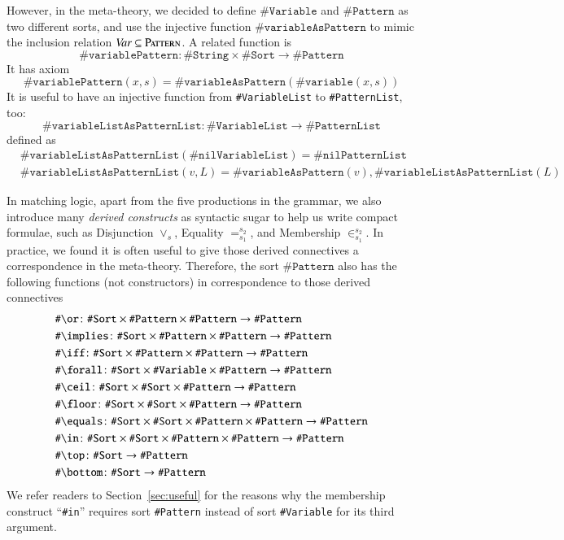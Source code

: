 \documentclass[UTF8,11pt]{article}
\theoremstyle{plain}
\theoremstyle{definition}
\theoremstyle{remark}
\newcommand{\sharpsymbol}{\#}
\newcommand{\KString}{\texttt{\sharpsymbol String}}
\newcommand{\KSort}{\texttt{\sharpsymbol Sort}}
\newcommand{\KPatternList}{\texttt{\sharpsymbol PatternList}}
\newcommand{\KnilKPatternList}{\texttt{\sharpsymbol nilPatternList}}
\newcommand{\KVariableList}{\texttt{\sharpsymbol VariableList}\xspace}
\newcommand{\KnilKVariableList}{\texttt{\sharpsymbol nilVariableList}}
\newcommand{\KVariable}{\texttt{\sharpsymbol Variable}}
\newcommand{\KVariableAsKPattern}{\texttt{\sharpsymbol variableAsPattern}}
\newcommand{\KvariablePattern}{\texttt{\sharpsymbol variablePattern}}
\newcommand{\KPattern}{\texttt{\sharpsymbol Pattern}}
\newcommand{\Kvariable}{\texttt{\sharpsymbol variable}}
\newcommand{\Kor}{\texttt{\sharpsymbol \slashsymbol  or}}
\newcommand{\Kimplies}{\texttt{\sharpsymbol  \slashsymbol implies}}
\newcommand{\Kiff}{\texttt{\sharpsymbol  \slashsymbol iff}}
\newcommand{\Kforall}{\texttt{\sharpsymbol \slashsymbol  forall}}
\newcommand{\Kequals}{\texttt{\sharpsymbol \slashsymbol  equals}}
\newcommand{\Kmembership}{\Kin}
\newcommand{\Kin}{\texttt{\sharpsymbol \slashsymbol  in}}
\newcommand{\Ktop}{\texttt{\sharpsymbol \slashsymbol  top}}
\newcommand{\Kbottom}{\texttt{\sharpsymbol \slashsymbol  bottom}}
\newcommand{\Kfloor}{\texttt{\sharpsymbol \slashsymbol  floor}}
\newcommand{\Kceil}{\texttt{\sharpsymbol \slashsymbol  ceil}}
\newcommand{\KVariableListAsKPatternList}
    {\texttt{\sharpsymbol variableListAsPatternList}\xspace}
\newcommand{\Pattern}{\textsc{Pattern}\xspace}
\newcommand{\slashsymbol}{\symbol{92}}
\begin{document}
However, in the meta-theory, we decided to define $\KVariable$ and $\KPattern$ as two different sorts, and use the injective function $\KVariableAsKPattern$ to mimic the inclusion relation $\Var \subseteq \Pattern$.
A related function is
$$
\KvariablePattern \colon \KString \times \KSort \to \KPattern
$$
It has axiom
$$
\KvariablePattern(x,s) = \KVariableAsKPattern(\Kvariable(x,s))
$$
It is useful to have an injective function from
\KVariableList to \KPatternList, too:
$$
\KVariableListAsKPatternList \colon \KVariableList \to \KPatternList
$$
defined as
\begin{align*}
&\KVariableListAsKPatternList(\KnilKVariableList) = \KnilKPatternList \\
&\KVariableListAsKPatternList(v, L) =
 \KVariableAsKPattern(v), \KVariableListAsKPatternList(L)
\end{align*}



In matching logic, apart from the five productions in the grammar, we also
introduce many \emph{derived constructs} as syntactic sugar to help
us write compact formulae, such as Disjunction $\vee_s$, Equality
$=_{s_1}^{s_2}$, and Membership $\in_{s_1}^{s_2}$.
In practice, we found it is often useful to give those derived connectives a
correspondence in the meta-theory. Therefore, the sort $\KPattern$ also has
the following functions (not constructors) in correspondence to those derived
connectives
\begin{align*}
  & \Kor \colon \KSort\times\KPattern \times \KPattern   \to \KPattern
  \\
  & \Kimplies \colon \KSort\times\KPattern \times \KPattern   \to \KPattern
  \\
  & \Kiff \colon \KSort\times\KPattern \times \KPattern   \to \KPattern
  \\
  & \Kforall \colon \KSort\times\KVariable \times \KPattern   \to \KPattern
  \\
  & \Kceil \colon \KSort\times\KSort\times\KPattern     \to \KPattern
  \\
  & \Kfloor \colon \KSort\times\KSort\times\KPattern     \to \KPattern
  \\
  & \Kequals \colon \KSort\times\KSort \times \KPattern \times \KPattern \to
  \KPattern
  \\
  & \Kmembership \colon \KSort \times \KSort \times \KPattern \times
  \KPattern  \to \KPattern
  \\
  & \Ktop \colon \KSort \to \KPattern
  \\
  & \Kbottom \colon \KSort \to \KPattern
\end{align*}
We refer readers to Section~\ref{sec:useful} for the reasons why the membership construct ``\Kin'' requires sort {\KPattern} instead of sort {\KVariable} for its third argument.
\end{document}
